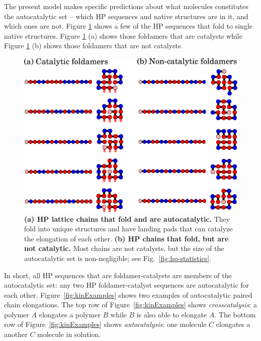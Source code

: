 \documentclass[twocolumn,letterpaper]{revtex4-1}
\begin{document}
 The present model makes specific predictions about what molecules constitutes the autocatalytic 
set -- which HP sequences and native structures are in it, and which ones are not.  Figure 
\ref{fig:fold-cat} shows a few of the HP sequences that fold to single native structures.  Figure 
\ref{fig:fold-cat} (a) shows those foldamers that are catalysts while Figure \ref{fig:fold-cat} 
(b) 
shows those foldamers that are not catalysts.  
 \begin{figure}[htb!]
  \centering
  \includegraphics[width=\columnwidth]{pictures/fold-cat.eps} 
  \caption{\footnotesize{\textbf{(a) HP lattice chains that fold and are autocatalytic.}  They 
fold 
into unique structures and have landing pads that can catalyze the elongation of each other.  
\textbf{(b) HP chains that fold, but are not catalytic.}  Most chains are not catalysts, but the 
size of the autocatalytic set is non-negligible; see Fig.~\ref{fig:hp-statistics}.}}
  \label{fig:fold-cat}
\end{figure}

 In short, all HP sequences that are foldamer-catalysts are members of the autocatalytic set: any 
two HP foldamer-catalyst sequences are autocatalytic for each other.  Figure~\ref{fig:kinExamples} 
shows two examples of autocatalytic paired chain elongations.  The top row of 
Figure~\ref{fig:kinExamples} shows \emph{crosscatalysis}: a polymer $A$ elongates a polymer $B$ 
while $B$ is also able to elongate $A$.  The bottom row of Figure~\ref{fig:kinExamples} shows 
\emph{autocatalysis}: one molecule $C$ elongates a another $C$ molecule in solution.
\end{document}
